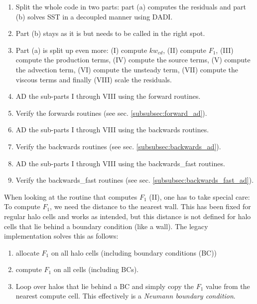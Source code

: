 \begin{enumerate}
    \item Split the whole code in two parts: part (a) computes the residuals
        and part (b) solves SST in a decoupled manner using DADI. 

    \item Part (b) stays as it is but needs to be called in the right spot.

    \item Part (a) is split up even more: (I) compute $kw_{cd}$, (II) compute
        $F_1$, (III) compute the production terms, (IV) compute the source
        terms, (V) compute the advection term, (VI) compute the unsteady term,
        (VII) compute the viscous terms and finally (VIII) scale the residuals.

    \item AD the sub-parts I through VIII using the forward routines. 

    \item Verify the forwards routines (see sec. \ref{subsubsec:forward_ad}).

    \item AD the sub-parts I through VIII using the backwards routines.

    \item Verify the backwards routines (see sec. \ref{subsubsec:backwards_ad}).

    \item AD the sub-parts I through VIII using the backwards\_fast routines.

    \item Verify the backwards\_fast routines (see sec.
        \ref{subsubsec:backwards_fast_ad}).
\end{enumerate}

\noindent When looking at the routine that computes $F_1$ (II), one has to take
special care: To compute $F_1$, we need the distance to the nearest wall. This
has been fixed for regular halo cells and works as intended, but this distance
is not defined for halo cells that lie behind a boundary condition (like a
wall). The legacy implementation solves this as follows:

\begin{enumerate}
    \item allocate $F_1$ on all halo cells (including boundary conditions (BC))

    \item compute $F_1$ on all cells (including BCs).

    \item Loop over halos that lie behind a BC and simply copy the $F_1$ value
        from the nearest compute cell. This effectively is a \textit{Neumann
        boundary condition}.
\end{enumerate}

